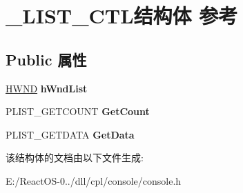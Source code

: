 \hypertarget{struct___l_i_s_t___c_t_l}{}\section{\+\_\+\+L\+I\+S\+T\+\_\+\+C\+T\+L结构体 参考}
\label{struct___l_i_s_t___c_t_l}
\subsection*{Public 属性}
\begin{DoxyCompactItemize}
\item 
\mbox{\label{struct___l_i_s_t___c_t_l_af91a7c545910f27281878d454d53a5ce}} 
\hyperlink{interfacevoid}{H\+W\+ND} {\bfseries h\+Wnd\+List}
\item 
\mbox{\label{struct___l_i_s_t___c_t_l_a2acb590f37d01d7d4a0145b85c46638b}} 
P\+L\+I\+S\+T\+\_\+\+G\+E\+T\+C\+O\+U\+NT {\bfseries Get\+Count}
\item 
\mbox{\label{struct___l_i_s_t___c_t_l_a64d1dda6603d9bf8e776dd39342a04fc}} 
P\+L\+I\+S\+T\+\_\+\+G\+E\+T\+D\+A\+TA {\bfseries Get\+Data}
\end{DoxyCompactItemize}


该结构体的文档由以下文件生成\+:\begin{DoxyCompactItemize}
\item 
E\+:/\+React\+O\+S-\/0../dll/cpl/console/console.\+h\end{DoxyCompactItemize}
